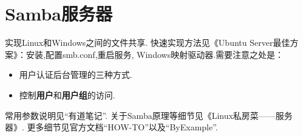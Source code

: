 \section{Samba服务器}
实现Linux和Windows之间的文件共享. 快速实现方法见《Ubuntu Server最佳方案》：安装,配置smb.conf,重启服务, Windows映射驱动器.需要注意之处是：
\begin{itemize}
    \item 用户认证后台管理的三种方式.
    
    \item 控制\textbf{用户}和\textbf{用户组}的访问.
\end{itemize}
\par
常用参数说明见“有道笔记”. 关于Samba原理等细节见《Linux私房菜——服务器》. 更多细节见官方文档“HOW-TO”以及“ByExample”.